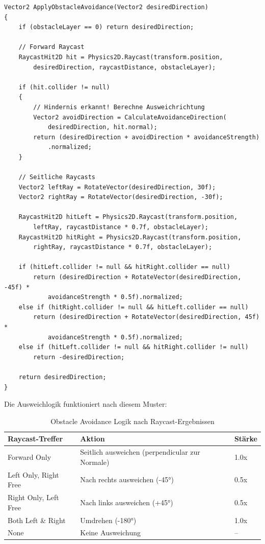 \documentclass[
  a4paper,
  11pt,
  ngerman,
  parskip=half,
  bibliography=totoc,
  listof=totoc
]{scrreprt}
\begin{document}
\begin{lstlisting}[caption={Obstacle Avoidance Algorithmus (Enemy\_Movement.cs)}, label=lst:obstacle_avoid]
Vector2 ApplyObstacleAvoidance(Vector2 desiredDirection)
{
    if (obstacleLayer == 0) return desiredDirection;

    // Forward Raycast
    RaycastHit2D hit = Physics2D.Raycast(transform.position,
        desiredDirection, raycastDistance, obstacleLayer);

    if (hit.collider != null)
    {
        // Hindernis erkannt! Berechne Ausweichrichtung
        Vector2 avoidDirection = CalculateAvoidanceDirection(
            desiredDirection, hit.normal);
        return (desiredDirection + avoidDirection * avoidanceStrength)
            .normalized;
    }

    // Seitliche Raycasts
    Vector2 leftRay = RotateVector(desiredDirection, 30f);
    Vector2 rightRay = RotateVector(desiredDirection, -30f);

    RaycastHit2D hitLeft = Physics2D.Raycast(transform.position,
        leftRay, raycastDistance * 0.7f, obstacleLayer);
    RaycastHit2D hitRight = Physics2D.Raycast(transform.position,
        rightRay, raycastDistance * 0.7f, obstacleLayer);

    if (hitLeft.collider != null && hitRight.collider == null)
        return (desiredDirection + RotateVector(desiredDirection, -45f) *
            avoidanceStrength * 0.5f).normalized;
    else if (hitRight.collider != null && hitLeft.collider == null)
        return (desiredDirection + RotateVector(desiredDirection, 45f) *
            avoidanceStrength * 0.5f).normalized;
    else if (hitLeft.collider != null && hitRight.collider != null)
        return -desiredDirection;

    return desiredDirection;
}
\end{lstlisting}

Die Ausweichlogik funktioniert nach diesem Muster:

\begin{table}[h]
\centering
\caption{Obstacle Avoidance Logik nach Raycast-Ergebnissen}
\label{tab:avoidance_logic}
\begin{tabular}{|l|l|l|}
\hline
\textbf{Raycast-Treffer} & \textbf{Aktion} & \textbf{Stärke} \\
\hline
Forward Only & Seitlich ausweichen (perpendicular zur Normale) & 1.0x \\
Left Only, Right Free & Nach rechts ausweichen (-45°) & 0.5x \\
Right Only, Left Free & Nach links ausweichen (+45°) & 0.5x \\
Both Left \& Right & Umdrehen (-180°) & 1.0x \\
None & Keine Ausweichung & -- \\
\hline
\end{tabular}
\end{table}
\end{document}
